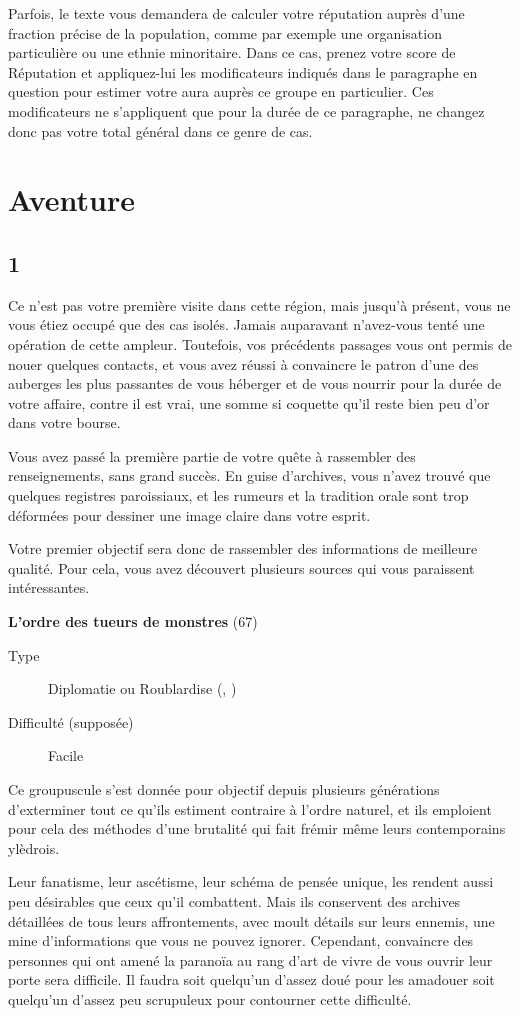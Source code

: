 \documentclass{report}
\newcommand{\gsection}[1]{
    \section{#1}
    \label{#1}
}
\newcommand{\quest}[5]{
    \begin{framed}
        \begin{center}
            \textbf{#1} (#2)
        \end{center}
        \begin{description}
            \item[Type] #3
            \item[Difficulté (supposée)] #4
        \end{description}
        #5
    \end{framed}
}
\begin{document}
Parfois, le texte vous demandera de calculer votre réputation auprès d'une fraction précise de la population, comme par exemple une organisation particulière ou une ethnie minoritaire. Dans ce cas, prenez votre score de Réputation et appliquez-lui les modificateurs indiqués dans le paragraphe en question pour estimer votre aura auprès ce groupe en particulier. Ces modificateurs ne s'appliquent que pour la durée de ce paragraphe, ne changez donc pas votre total général dans ce genre de cas.

\chapter{Aventure}

\gsection{1}

Ce n'est pas votre première visite dans cette région, mais jusqu'à présent, vous ne vous étiez occupé que des cas isolés. Jamais auparavant n'avez-vous tenté une opération de cette ampleur. Toutefois, vos précédents passages vous ont permis de nouer quelques contacts, et vous avez réussi à convaincre le patron d'une des auberges les plus passantes de vous héberger et de vous nourrir pour la durée de votre affaire, contre il est vrai, une somme si coquette qu'il reste bien peu d'or dans votre bourse.

Vous avez passé la première partie de votre quête à rassembler des renseignements, sans grand succès. En guise d'archives, vous n'avez trouvé que quelques registres paroissiaux, et les rumeurs et la tradition orale sont trop déformées pour dessiner une image claire dans votre esprit.

Votre premier objectif sera donc de rassembler des informations de meilleure qualité. Pour cela, vous avez découvert plusieurs sources qui vous paraissent intéressantes.

\quest{L'ordre des tueurs de monstres}{67}{Diplomatie ou Roublardise (\ankh, \cross)}{Facile}{
Ce groupuscule s'est donnée pour objectif depuis plusieurs générations d'exterminer tout ce qu'ils estiment contraire à l'ordre naturel, et ils emploient pour cela des méthodes d'une brutalité qui fait frémir même leurs contemporains ylèdrois.

Leur fanatisme, leur ascétisme, leur schéma de pensée unique, les rendent aussi peu désirables que ceux qu'il combattent. Mais ils conservent des archives détaillées de tous leurs affrontements, avec moult détails sur leurs ennemis, une mine d'informations que vous ne pouvez ignorer.
Cependant, convaincre des personnes qui ont amené la paranoïa au rang d'art de vivre de vous ouvrir leur porte sera difficile. Il faudra soit quelqu'un d'assez doué pour les amadouer soit quelqu'un d'assez peu scrupuleux pour contourner cette difficulté.
}
\end{document}

